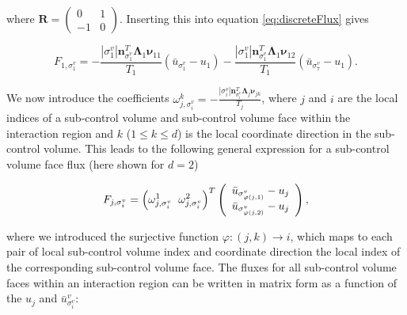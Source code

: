 where $\mathbf{R} = \left( {\begin{array}{cc}
                                     0 & 1 \\
                                     -1 & 0
                                     \end{array} } \right)$. Inserting this into equation \eqref{eq:discreteFlux} gives

\begin{equation}
    F_{1, \sigma^v_1} = - \frac{|\sigma^v_1| \mathbf{n}_{\sigma^v_1}^T \mathbf{\Lambda}_1 \boldsymbol{\nu}_{11}}{T_1} (\bar{u}_{\sigma^v_1} - u_1) -
                         \frac{|\sigma^v_1| \mathbf{n}_{\sigma^v_1}^T \mathbf{\Lambda}_1 \boldsymbol{\nu}_{12}}{T_1} (\bar{u}_{\sigma^v_7} - u_1).
\end{equation}

We now introduce the coefficients $\omega^k_{j, \sigma_i^v} = - \frac{|\sigma^v_i| \mathbf{n}_{\sigma^v_i}^T \mathbf{\Lambda}_j \boldsymbol{\nu}_{jk}}{T_j}$, where $j$ and $i$ are the local indices of a sub-control volume and sub-control volume face within the interaction region and $k$ ($1 \leq k \leq d$) is the local coordinate direction in the sub-control volume. This leads to the following general expression for a sub-control volume face flux (here shown for $d = 2$)

\begin{equation}
    F_{j, \sigma^v_i} = \left( \omega^1_{j, \sigma^v_i} \hspace{2mm} \omega^2_{j, \sigma^v_i} \right)^T \left( {\begin{array}{c}
                                                                                                                \bar{u}_{\sigma^v_{\varphi(j, 1)}} - u_j \\
                                                                                                                \bar{u}_{\sigma^v_{\varphi(j, 2)}} - u_j
                                                                                                                \end{array} } \right),
\end{equation}

where we introduced the surjective function $\varphi: (j, k) \rightarrow i$, which maps to each pair of local sub-control volume index and coordinate direction the local index of the corresponding sub-control volume face. The fluxes for all sub-control volume faces within an interaction region can be written in matrix form as a function of the $u_j$ and $\bar{u}^v_{\sigma^v_i}$:

